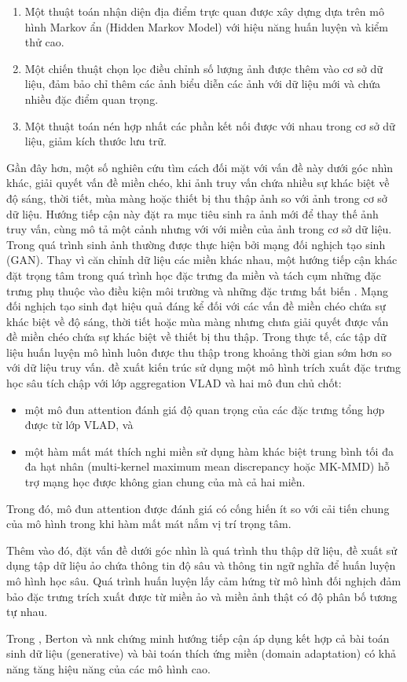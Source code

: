 \begin{enumerate}
    \item Một thuật toán nhận diện địa điểm trực quan được xây dựng dựa trên mô hình Markov ẩn (Hidden Markov Model) với hiệu năng huấn luyện và kiểm thử cao.
    \item Một chiến thuật chọn lọc điều chỉnh số lượng ảnh được thêm vào cơ sở dữ liệu, đảm bảo chỉ thêm các ảnh biểu diễn các ảnh với dữ liệu mới và chứa nhiều đặc điểm quan trọng.
    \item Một thuật toán nén hợp nhất các phần kết nối được với nhau trong cơ sở dữ liệu, giảm kích thước lưu trữ.
\end{enumerate}

Gần đây hơn, một số nghiên cứu tìm cách đối mặt với vấn đề này dưới góc nhìn khác, giải quyết vấn đề miền chéo, khi ảnh truy vấn chứa nhiều sự khác biệt về độ sáng, thời tiết, mùa màng hoặc thiết bị thu thập ảnh so với ảnh trong cơ sở dữ liệu. Hướng tiếp cận này đặt ra mục tiêu sinh ra ảnh mới để thay thế ảnh truy vấn, cùng mô tả một cảnh nhưng với với miền của ảnh trong cơ sở dữ liệu. Trong \cite{Porav2018AdversarialTF, Annosheh2019Night} quá trình sinh ảnh thường được thực hiện bởi mạng đối nghịch tạo sinh (GAN). Thay vì căn chỉnh dữ liệu các miền khác nhau, một hướng tiếp cận khác đặt trọng tâm trong quá trình học đặc trưng đa miền và tách cụm những đặc trưng phụ thuộc vào điều kiện môi trường và những đặc trưng bất biến \cite{yin2019multi}. Mạng đối nghịch tạo sinh đạt hiệu quả đáng kể đối với các vấn đề miền chéo chứa sự khác biệt về độ sáng, thời tiết hoặc mùa màng nhưng chưa giải quyết được vấn đề miền chéo chứa sự khác biệt về thiết bị thu thập. Trong thực tế, các tập dữ liệu huấn luyện mô hình luôn được thu thập trong khoảng thời gian sớm hơn so với dữ liệu truy vấn. \cite{wang2019attention} đề xuất kiến trúc sử dụng một mô hình trích xuất đặc trưng học sâu tích chập với lớp aggregation VLAD \cite{jegou2010aggregating} và hai mô đun chủ chốt:

\begin{itemize}
    \item một mô đun attention đánh giá độ quan trọng của các đặc trưng tổng hợp được từ lớp VLAD, và
    \item một hàm mất mát thích nghi miền sử dụng hàm khác biệt trung bình tối đa đa hạt nhân (multi-kernel maximum mean discrepancy hoặc MK-MMD) hỗ trợ mạng học được không gian chung của mà cả hai miền.
\end{itemize}

Trong đó, mô đun attention được đánh giá có cống hiến ít so với cải tiến chung của mô hình trong khi hàm mất mát nắm vị trí trọng tâm.

Thêm vào đó, đặt vấn đề dưới góc nhìn là quá trình thu thập dữ liệu, \cite{hu2020dasgil} đề xuất sử dụng tập dữ liệu ảo chứa thông tin độ sâu và thông tin ngữ nghĩa để huấn luyện mô hình học sâu. Quá trình huấn luyện lấy cảm hứng từ mô hình đối nghịch đảm bảo đặc trưng trích xuất được từ miền ảo và miền ảnh thật có độ phân bố tương tự nhau.

Trong \cite{PAOLICELLI-2022-FRONTIERS}, Berton và nnk chứng minh hướng tiếp cận áp dụng kết hợp cả bài toán sinh dữ liệu (generative) và bài toán thích ứng miền (domain adaptation) có khả năng tăng hiệu năng của các mô hình cao.
